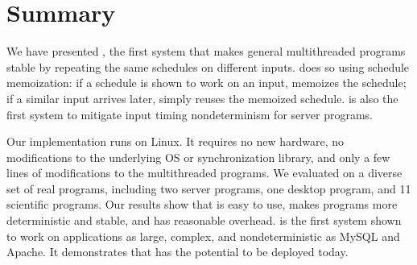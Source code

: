 \section{Summary}
\label{sec:conclusion}

We have presented \tern, the first \dmt system that makes general
multithreaded programs stable by repeating the same schedules on different
inputs.  \tern does so using schedule memoization: if a schedule is shown
to work on an input, \tern memoizes the schedule; if a similar input
arrives later, \tern simply reuses the memoized schedule. \tern is also the
first \dmt system to mitigate input timing nondeterminism for server
programs.

Our \tern implementation runs on Linux.  It requires no new hardware, no
modifications to the underlying OS or synchronization library, and only a
few lines of modifications to the multithreaded programs.  We evaluated
\tern on a diverse set of real programs, including two server programs, one
desktop program, and 11 scientific programs.  Our results show that
\tern is easy to use, makes programs more deterministic and stable, and has
reasonable overhead.  \tern is the first \dmt system shown to work on
applications as large, complex, and nondeterministic as MySQL and Apache.
It demonstrates that \dmt has the potential to be deployed today.

